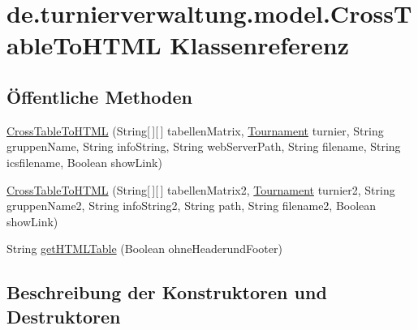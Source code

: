 \hypertarget{classde_1_1turnierverwaltung_1_1model_1_1_cross_table_to_h_t_m_l}{}\section{de.\+turnierverwaltung.\+model.\+Cross\+Table\+To\+H\+T\+ML Klassenreferenz}
\label{classde_1_1turnierverwaltung_1_1model_1_1_cross_table_to_h_t_m_l}
\subsection*{Öffentliche Methoden}
\begin{DoxyCompactItemize}
\item 
\hyperlink{classde_1_1turnierverwaltung_1_1model_1_1_cross_table_to_h_t_m_l_a8f08dc753d3c14ca74af5e681d0a73f7}{Cross\+Table\+To\+H\+T\+ML} (String\mbox{[}$\,$\mbox{]}\mbox{[}$\,$\mbox{]} tabellen\+Matrix, \hyperlink{classde_1_1turnierverwaltung_1_1model_1_1_tournament}{Tournament} turnier, String gruppen\+Name, String info\+String, String web\+Server\+Path, String filename, String icsfilename, Boolean show\+Link)
\item 
\hyperlink{classde_1_1turnierverwaltung_1_1model_1_1_cross_table_to_h_t_m_l_aef5e1ac5afd37c14a3553222749cea75}{Cross\+Table\+To\+H\+T\+ML} (String\mbox{[}$\,$\mbox{]}\mbox{[}$\,$\mbox{]} tabellen\+Matrix2, \hyperlink{classde_1_1turnierverwaltung_1_1model_1_1_tournament}{Tournament} turnier2, String gruppen\+Name2, String info\+String2, String path, String filename2, Boolean show\+Link)
\item 
String \hyperlink{classde_1_1turnierverwaltung_1_1model_1_1_cross_table_to_h_t_m_l_a0628aa777cbbbe562bab8b9ed0e97055}{get\+H\+T\+M\+L\+Table} (Boolean ohne\+Headerund\+Footer)
\end{DoxyCompactItemize}


\subsection{Beschreibung der Konstruktoren und Destruktoren}
